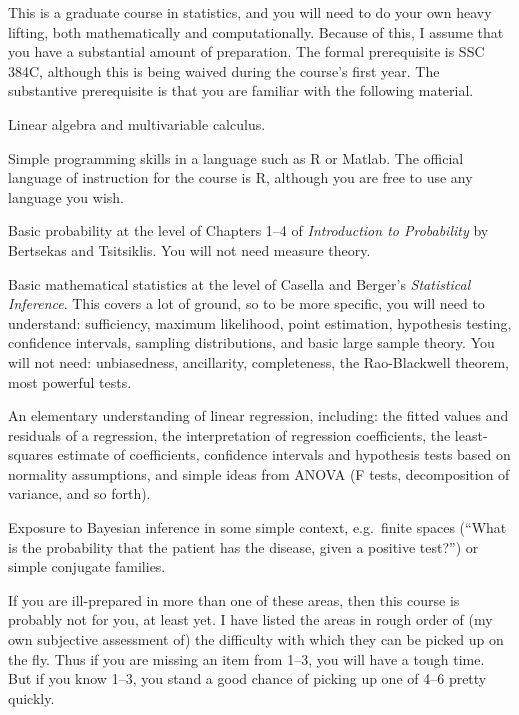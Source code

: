 \documentclass{mynotes}
\begin{document}
This is a graduate course in statistics, and you will need to do your own heavy lifting, both mathematically and computationally.  Because of this, I assume that you have a substantial amount of preparation.  The formal prerequisite is SSC 384C, although this is being waived during the course's first year.  The substantive prerequisite is that you are familiar with the following material.
\begin{compactenum}[(1)]
\item Linear algebra and multivariable calculus.
\item Simple programming skills in a language such as R or Matlab.  The official language of instruction for the course is R, although you are free to use any language you wish.
\item Basic probability at the level of Chapters 1--4 of \textit{Introduction to Probability} by Bertsekas and Tsitsiklis.  You will not need measure theory.
\item Basic mathematical statistics at the level of Casella and Berger's \textit{Statistical Inference}.  This covers a lot of ground, so to be more specific, you will need to understand: sufficiency, maximum likelihood, point estimation, hypothesis testing, confidence intervals, sampling distributions, and basic large sample theory.  You will not need: unbiasedness, ancillarity, completeness, the Rao-Blackwell theorem, most powerful tests.
\item An elementary understanding of linear regression, including: the fitted values and residuals of a regression, the interpretation of regression coefficients, the least-squares estimate of coefficients, confidence intervals and hypothesis tests based on normality assumptions, and simple ideas from ANOVA (F tests, decomposition of variance, and so forth).\
\item Exposure to Bayesian inference in some simple context, e.g.~finite spaces (``What is the probability that the patient has the disease, given a positive test?'') or simple conjugate families.
\end{compactenum}

If you are ill-prepared in more than one of these areas, then this course is probably not for you, at least yet.  I have listed the areas in rough order of (my own subjective assessment of) the difficulty with which they can be picked up on the fly.  Thus if you are missing an item from 1--3, you will have a tough time.  But if you know 1--3, you stand a good chance of picking up one of 4--6 pretty quickly.
\end{document}
